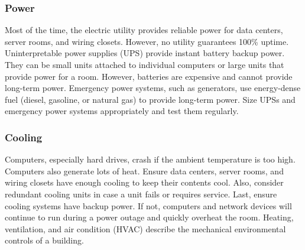 \subsubsection{Power}
Most of the time, the electric utility provides reliable power for data centers, server rooms, and wiring closets. However, no utility guarantees 100\% uptime. Uninterpretable power supplies (UPS) provide instant battery backup power. They can be small units attached to individual computers or large units that provide power for a room. However, batteries are expensive and cannot provide long-term power. Emergency power systems, such as generators, use energy-dense fuel (diesel, gasoline, or natural gas) to provide long-term power. Size UPSs and emergency power systems appropriately and test them regularly.
\subsubsection{Cooling}
Computers, especially hard drives, crash if the ambient temperature is too high. Computers also generate lots of heat. Ensure data centers, server rooms, and wiring closets have enough cooling to keep their contents cool. Also, consider redundant cooling units in case a unit fails or requires service. Last, ensure cooling systems have backup power. If not, computers and network devices will continue to run during a power outage and quickly overheat the room. Heating, ventilation, and air condition (HVAC) describe the mechanical environmental controls of a building.
